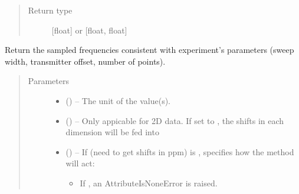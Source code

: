 \documentclass[letterpaper,10pt,english]{sphinxmanual}
\begin{document}
\begin{fulllineitems}
\begin{fulllineitems}
\begin{quote}
\begin{description}
\item[{Return type}] \leavevmode
\sphinxAtStartPar
{[}float{]} or {[}float, float{]}

\end{description}\end{quote}

\end{fulllineitems}


\begin{fulllineitems}
\label{\detokenize{references/core:nmrespy.core.Estimator.get_shifts}}
\sphinxAtStartPar
Return the sampled frequencies consistent with experiment’s
parameters (sweep width, transmitter offset, number of points).
\begin{quote}\begin{description}
\item[{Parameters}] \leavevmode\begin{itemize}
\item {} 
\sphinxAtStartPar
{} (\sphinxstyleliteralemphasis{\sphinxupquote{, }}) – The unit of the value(s).

\item {} 
\sphinxAtStartPar
{} () – Only appicable for 2D data. If set to , the shifts in
each dimension will be fed into

\item {} 
\sphinxAtStartPar
{} () – 
\sphinxAtStartPar
If  (need to get shifts in ppm) is , 
specifies how the method will act:
\begin{itemize}
\item {} 
\sphinxAtStartPar
If , an AttributeIsNoneError is raised.


\end{itemize}
\end{itemize}
\end{description}
\end{quote}
\end{fulllineitems}
\end{fulllineitems}
\end{document}
